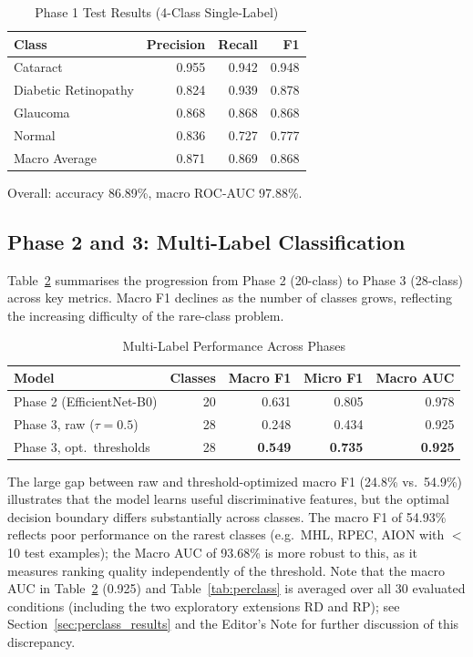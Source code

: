 \documentclass[conference]{IEEEtran}
\begin{document}
\begin{table}[htbp]
\centering
\caption{Phase 1 Test Results (4-Class Single-Label)}
\label{tab:phase1}
\begin{tabular}{lrrr}
\toprule
Class & Precision & Recall & F1 \\
\midrule
Cataract              & 0.955 & 0.942 & 0.948 \\
Diabetic Retinopathy  & 0.824 & 0.939 & 0.878 \\
Glaucoma              & 0.868 & 0.868 & 0.868 \\
Normal                & 0.836 & 0.727 & 0.777 \\
\midrule
Macro Average         & 0.871 & 0.869 & 0.868 \\
\bottomrule
\end{tabular}
\end{table}

Overall: accuracy 86.89\%, macro ROC-AUC 97.88\%.

\subsection{Phase 2 and 3: Multi-Label Classification}
Table~\ref{tab:overall_multilabel} summarises the progression from Phase 2 (20-class) to Phase 3 (28-class) across key metrics. Macro F1 declines as the number of classes grows, reflecting the increasing difficulty of the rare-class problem.

\begin{table}[htbp]
\centering
\caption{Multi-Label Performance Across Phases}
\label{tab:overall_multilabel}
\begin{tabular}{lrrrr}
\toprule
Model & Classes & Macro F1 & Micro F1 & Macro AUC \\
\midrule
Phase 2 (EfficientNet-B0) & 20 & 0.631 & 0.805 & 0.978 \\
Phase 3, raw ($\tau{=}0.5$) & 28 & 0.248 & 0.434 & 0.925 \\
Phase 3, opt.\ thresholds  & 28 & \textbf{0.549} & \textbf{0.735} & \textbf{0.925} \\
\bottomrule
\end{tabular}
\end{table}

The large gap between raw and threshold-optimized macro F1 (24.8\% vs.\ 54.9\%) illustrates that the model learns useful discriminative features, but the optimal decision boundary differs substantially across classes. The macro F1 of 54.93\% reflects poor performance on the rarest classes (e.g.\ MHL, RPEC, AION with $<$10 test examples); the Macro AUC of 93.68\% is more robust to this, as it measures ranking quality independently of the threshold. Note that the macro AUC in Table~\ref{tab:overall_multilabel} (0.925) and Table~\ref{tab:perclass} is averaged over all 30 evaluated conditions (including the two exploratory extensions RD and RP); see Section~\ref{sec:perclass_results} and the Editor's Note for further discussion of this discrepancy.
\end{document}
